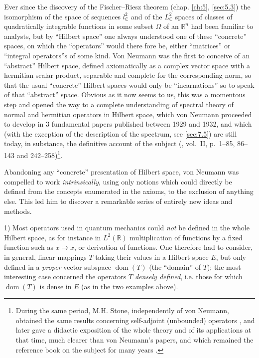 \documentclass[12pt,a4paper,leqno,twoside]{extbook}
\newcommand{\C}{\mathbb{C}}
\newcommand{\R}{\mathbb{R}}
\newcommand{\dom}{\operatorname{dom}}
\begin{document}
Ever since the discovery of the Fischer--Riesz theorem (chap. \ref{ch:5}, \ref{sec:5.3}) the isomorphism of the space of sequences \(l^2_{\C}\) and of the \(L^2_{\C}\) spaces of classes of quadratically integrable functions in some subset \(\Omega\) of an \(\R^n\) had been familiar to analysts, but by ``Hilbert space'' one always understood one of these ``concrete'' spaces, on which the ``operators'' would there fore be, either ``matrices'' or ``integral operators''s of some kind. Von Neumann was the first to conceive of an ``abstract'' Hilbert space, defined axiomatically as a complex vector space with a hermitian scalar product, separable and complete for the corresponding norm, so that the usual ``concrete'' Hilbert spaces would only be ``incarnations'' so to speak of that ``abstract'' space. Obvious as it now seems to us, this was a momentous step and opened the way to a complete understanding of spectral theory of normal and hermitian operators in Hilbert space, which von Neumann proceeded to develop in 3 fundamental papers published between 1929 and 1932, and which (with the exception of the description of the spectrum, see \ref{sec:7.5}) are still today, in substance, the definitive account of the subject (\cite{221}, vol.~II, p.~1--85, 86--143 and 242--258)\footnote{During the same period, M.H. Stone, independently of von Neumann, obtained the same results concerning self-adjoint (unbounded) operators \cite{206}, and later gave a didactic exposition of the whole theory and of its applications at that time, much clearer than von Neumann's papers, and which remained the reference book on the subject for many years \cite{207}.}.

Abandoning any ``concrete'' presentation of Hilbert space, von Neumann was compelled to work \emph{intrinsically}, using only notions which could directly be defined from the concepts enumerated in the axioms, to the exclusion of anything else. This led him to discover a remarkable series of entirely new ideas and methods.

1) Most operators used in quantum mechanics could \emph{not} be defined in the whole Hilbert space, as for instance in \(L^2(\R)\) multiplication of functions by a fixed function such as \(x \mapsto x\), or derivation of functions. One therefore had to consider, in general, linear mappings \(T\) taking their values in a Hilbert space \(E\), but only defined in a \emph{proper} vector subspace \(\dom(T)\) (the ``domain'' of \(T\)); the most interesting case concerned the operators \(T\) \emph{densely defined}, i.e. those for which \(\dom(T)\) is dense in \(E\) (as in the two examples above).
\end{document}
